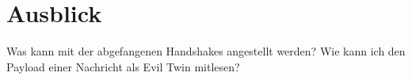 \section{Ausblick}
Was kann mit der abgefangenen Handshakes angestellt werden? 
Wie kann ich den Payload einer Nachricht als Evil Twin mitlesen? 